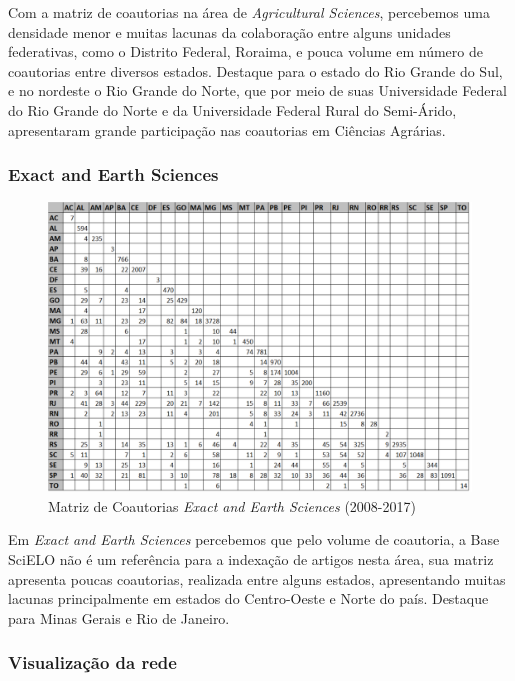 Com a matriz de coautorias na área de \textit{Agricultural Sciences}, percebemos uma densidade menor e muitas lacunas da colaboração entre alguns unidades federativas, como o Distrito Federal, Roraima, e pouca volume em número de coautorias entre diversos estados. Destaque para o estado do Rio Grande do Sul, e no nordeste o Rio Grande do Norte, que por meio de suas  Universidade Federal do Rio Grande do Norte e da Universidade Federal Rural do Semi-Árido, apresentaram grande participação nas coautorias em Ciências Agrárias.

\subsubsection{Exact and Earth Sciences}

\begin{figure}[H]
	\begin{adjustwidth}{-.6in}{-.6in}
		\centering
		\includegraphics[scale=0.6]{Imagens/exact/matriz-uf.pdf}
		\caption{Matriz de Coautorias \textit{Exact and Earth Sciences} (2008-2017)}
		\label{matriz-agri}
	\end{adjustwidth}
\end{figure}

Em \textit{Exact and Earth Sciences} percebemos que pelo volume de coautoria, a Base SciELO não é um referência para a indexação de artigos nesta área, sua matriz apresenta poucas coautorias, realizada entre alguns estados, apresentando muitas lacunas principalmente em estados do Centro-Oeste e Norte do país. Destaque para Minas Gerais e Rio de Janeiro.

\subsubsection{Visualização da rede}

